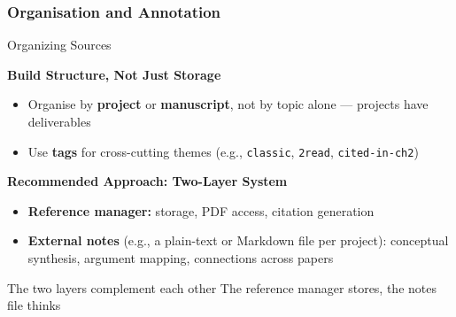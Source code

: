 \documentclass{beamer}
\begin{document}
\subsubsection{Organisation and Annotation}
\begin{frame}{Organizing Sources}

  \footnotesize
  \textbf{Build Structure, Not Just Storage}
  \begin{itemize}
    \item Organise by \textbf{project} or \textbf{manuscript},
      not by topic alone --- projects have deliverables
    \item Use \textbf{tags} for cross-cutting themes
      {\scriptsize (e.g., \texttt{classic},
      \texttt{2read}, \texttt{cited-in-ch2})}
  \end{itemize}

  \medskip
  \textbf{Recommended Approach: Two-Layer System}
  \begin{itemize}
    \item \textbf{Reference manager:} storage, PDF access, citation generation
    \item \textbf{External notes} (e.g., a plain-text or
      Markdown file per project): conceptual synthesis,
      argument mapping, connections across papers
  \end{itemize}
  \begin{block}{The two layers complement each other}
    The reference manager stores, the notes file thinks
  \end{block}
\end{frame}
\end{document}
